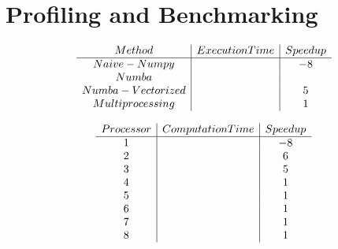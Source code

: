\documentclass{article}
\begin{document}
\section{Profiling and Benchmarking}

\begin{align}
    \begin{array}{c | c | c}
         Method  & Execution Time & Speedup \\ 
         \hline %
         Naive-Numpy   &  & -8 \\
         Numba      &  &    \\
         Numba - Vectorized &  & 5 \\
         Multiprocessing &  & 1 \\
    \end{array}
\end{align}



\begin{align}
    \begin{array}{c | c | c}
         Processor  & Computation Time & Speedup \\ 
         \hline %
         1   &  & -8 \\
         2   &  &  6  \\
         3   &  & 5 \\
         4   &  & 1 \\
         5   &  & 1 \\
         6   &  & 1 \\
         7   &  & 1 \\
         8   &  & 1 \\
    \end{array}
\end{align}
\end{document}
